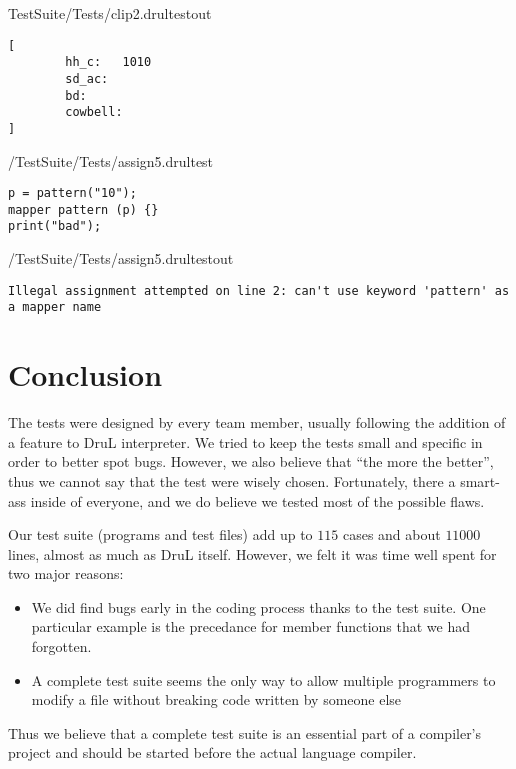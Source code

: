 TestSuite/Tests/clip2.drultestout

\begin{lstlisting}[basicstyle=\color{blue}\small]
[
        hh_c:   1010
        sd_ac:
        bd:
        cowbell:
]
\end{lstlisting}




/TestSuite/Tests/assign5.drultest
\begin{lstlisting}[basicstyle=\color{red}\small]
p = pattern("10");
mapper pattern (p) {}
print("bad");
\end{lstlisting}

/TestSuite/Tests/assign5.drultestout
\begin{lstlisting}[basicstyle=\color{blue}\small]
Illegal assignment attempted on line 2: can't use keyword 'pattern' as a mapper name
\end{lstlisting}




\section{Conclusion}
The tests were designed by every team member, usually following the addition
of a feature to DruL interpreter. We tried to keep the tests small and specific
in order to better spot bugs. However, we also believe that ``the more the
better'', thus we cannot say that the test were wisely chosen. Fortunately,
there a smart-ass inside of everyone, and we do believe we tested most of
the possible flaws.

Our test suite (programs and test files) add up to $115$ cases and 
about $11000$ lines, almost
as much as DruL itself. However, we felt it was time well spent for two major
reasons:
\begin{itemize}
\item We did find bugs early in the coding process thanks to the test suite. One
particular example is the precedance for member functions that we had forgotten.
\item A complete test suite seems the only way to allow multiple programmers to
modify a file without breaking code written by someone else
\end{itemize}
Thus we believe that a complete test suite is an essential part of a compiler's
project and should be started before the actual language compiler.


